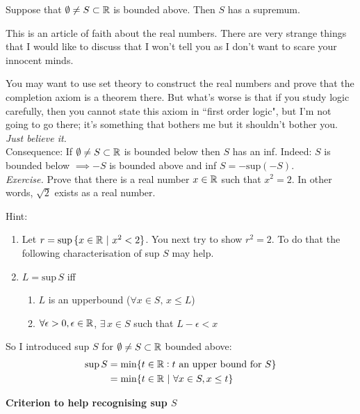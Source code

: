 \documentclass[10pt]{scrartcl}
\begin{document}
\begin{axiom}[Completeness of $\RR$]
Suppose that $\emptyset \neq S \subset \mathbb{R}$ is bounded above. Then $S$ has a supremum.
\end{axiom}

This is an article of faith about the real numbers. There are very strange things that I would like to discuss that I won't tell you as I don't want to scare your innocent minds.

 You may want to use set theory to construct the real numbers and prove that the completion axiom is a theorem there. But what's worse is that if you study logic carefully, then you cannot state this axiom in ``first order logic", but I'm not going to go there; it's something that bothers me but it shouldn't bother you. \emph{Just believe it.}\\


Consequence: If $\emptyset \neq S \subset \mathbb{R}$ is bounded below then $S$ has an inf. Indeed: $S$ is bounded below $\implies -S$ is bounded above and inf $S=- \mathrm{sup}(-S)$.\\

\emph{Exercise.} Prove that there is a real number $x \in\mathbb{R}$ such that $x^2 = 2$. In other words, $\sqrt{2}$ exists as a real number. 

Hint: \begin{enumerate}
 \item Let $r = \sup\,\{x \in\mathbb{R} ~|~ x^2 < 2\}$. You next try to show $r^2 = 2$. To do that the following characterisation of sup $S$ may help. 
 \item $L = \mathrm{sup}\,S$ iff 
 \begin{enumerate}
 \item $L$ is an upperbound ($\forall x \in S,\, x \leq L$)
 \item $\forall \epsilon >0, \epsilon \in\mathbb{R}$, $\exists \, x \in S$ such that $L-\epsilon < x$
 \end{enumerate}
 \end{enumerate}\vspace*{10pt}


So 
I introduced sup $S$ for $\emptyset \neq S \subset \mathbb{R}$ bounded above: 
\[
\begin{aligned}
  \mathrm{sup}\,S &= \min\{ t\in\mathbb{R}: t \text{ an upper bound for } S\}\\
  &= \min\{t \in\mathbb{R} ~|~ \forall x \in S, x \leq t\}
\end{aligned}
\]

\textbf{Criterion to help recognising sup $S$}
\end{document}
